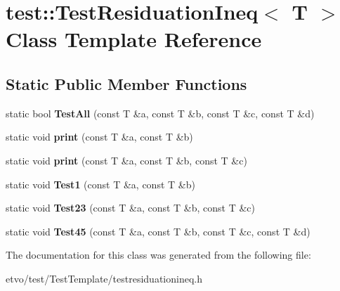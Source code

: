 \hypertarget{classtest_1_1_test_residuation_ineq}{}\section{test\+:\+:Test\+Residuation\+Ineq$<$ T $>$ Class Template Reference}
\label{classtest_1_1_test_residuation_ineq}
\subsection*{Static Public Member Functions}
\begin{DoxyCompactItemize}
\item 
\mbox{\label{classtest_1_1_test_residuation_ineq_a33c8db3f49174c5507fed75c138d4503}} 
static bool {\bfseries Test\+All} (const T \&a, const T \&b, const T \&c, const T \&d)
\item 
\mbox{\label{classtest_1_1_test_residuation_ineq_ad75b896155a03eacaa7f8d1cb09c7c21}} 
static void {\bfseries print} (const T \&a, const T \&b)
\item 
\mbox{\label{classtest_1_1_test_residuation_ineq_adb7924c60699959517247ef616c5027e}} 
static void {\bfseries print} (const T \&a, const T \&b, const T \&c)
\item 
\mbox{\label{classtest_1_1_test_residuation_ineq_a3cec4a74e8ff0a110e4f76bec40e1f49}} 
static void {\bfseries Test1} (const T \&a, const T \&b)
\item 
\mbox{\label{classtest_1_1_test_residuation_ineq_a8d8c4075495ae497209f4512229334f3}} 
static void {\bfseries Test23} (const T \&a, const T \&b, const T \&c)
\item 
\mbox{\label{classtest_1_1_test_residuation_ineq_a65549d03aab257dd099634c7ff83c1c8}} 
static void {\bfseries Test45} (const T \&a, const T \&b, const T \&c, const T \&d)
\end{DoxyCompactItemize}


The documentation for this class was generated from the following file\+:\begin{DoxyCompactItemize}
\item 
etvo/test/\+Test\+Template/testresiduationineq.\+h\end{DoxyCompactItemize}
